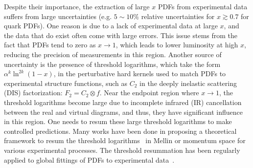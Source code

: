 \documentclass[a4paper,11pt]{article}
\begin{document}
Despite their importance, the extraction of large $x$ PDFs from experimental data suffers from large uncertainties (e.g. $5\sim10\%$ relative uncertainties for $x \gtrsim 0.7$ for quark PDFs). One reason is due to a lack of experimental data at large $x$, and the data that do exist often come with large errors. This issue stems from the fact that PDFs tend to zero as $x \rightarrow 1$, which leads to lower luminosity at high $x$, reducing the precision of measurements in this region. Another source of uncertainty is the presence of threshold logarithms, which take the form $\alpha^{k} \ln^{2k}(1-x)$, in the perturbative hard kernels used to match PDFs to experimental structure functions, such as $C_2$ in the deeply inelastic scattering (DIS) factorization: $F_2 = C_2 \otimes f$. Near the endpoint region where $x \rightarrow 1$, the threshold logarithms become large due to incomplete infrared (IR) cancellation between the real and virtual diagrams, and thus, they have significant influence in this region. One needs to resum these large threshold logarithms to make controlled predictions. Many works have been done in proposing a theoretical framework to resum the threshold logarithms~\cite{Sterman:1986aj,Catani:1989ne,Bauer:2002nz,Manohar:2003vb,Pecjak:2005uh,Chay:2005rz,Idilbi:2006dg,Chen:2006vd,Becher:2006mr,Bonvini:2012az,Bauer:2000yr,Bauer:2001yt,Becher:2014oda,Becher:2007ty,Das:2019btv,Das:2020adl,AH:2020cok,Das:2023bfi,Banerjee:2017cfc,Banerjee:2018vvb,Moch:2005ba} in Mellin or momentum space for various experimental processes. The threshold resummation has been regularly applied to global fittings of PDFs to experimental data~\cite{Corcella:2005us,Aicher:2010cb,Bonvini:2015ira,Westmark:2017uig,Barry:2021osv}. 
\end{document}
